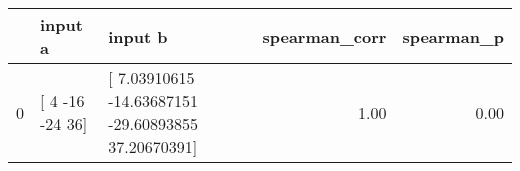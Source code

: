 \begin{tabular}{lllrr}
\toprule
 & input a & input b & spearman\_corr & spearman\_p \\
\midrule
0 & [  4 -16 -24  36] & [  7.03910615 -14.63687151 -29.60893855  37.20670391] & 1.00 & 0.00 \\
\bottomrule
\end{tabular}
